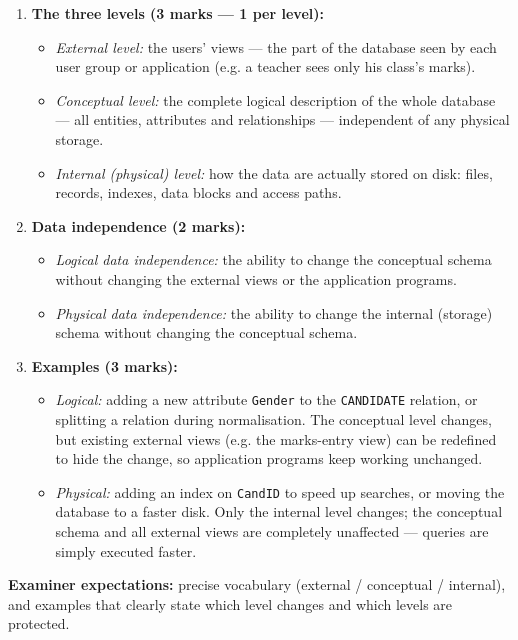 \documentclass[11pt]{article}
\begin{document}
\begin{corrige}
\begin{enumerate}
\item \textbf{The three levels (3 marks — 1 per level):}
\begin{itemize}
\item \emph{External level:} the users' views — the part of the database seen by each user group or application (e.g. a teacher sees only his class's marks).
\item \emph{Conceptual level:} the complete logical description of the whole database — all entities, attributes and relationships — independent of any physical storage.
\item \emph{Internal (physical) level:} how the data are actually stored on disk: files, records, indexes, data blocks and access paths.
\end{itemize}
\item \textbf{Data independence (2 marks):}
\begin{itemize}
\item \emph{Logical data independence:} the ability to change the conceptual schema without changing the external views or the application programs.
\item \emph{Physical data independence:} the ability to change the internal (storage) schema without changing the conceptual schema.
\end{itemize}
\item \textbf{Examples (3 marks):}
\begin{itemize}
\item \emph{Logical:} adding a new attribute \texttt{Gender} to the \texttt{CANDIDATE} relation, or splitting a relation during normalisation. The conceptual level changes, but existing external views (e.g. the marks-entry view) can be redefined to hide the change, so application programs keep working unchanged.
\item \emph{Physical:} adding an index on \texttt{CandID} to speed up searches, or moving the database to a faster disk. Only the internal level changes; the conceptual schema and all external views are completely unaffected — queries are simply executed faster.
\end{itemize}
\end{enumerate}
\textbf{Examiner expectations:} precise vocabulary (external / conceptual / internal), and examples that clearly state which level changes and which levels are protected.
\end{corrige}
\end{document}
